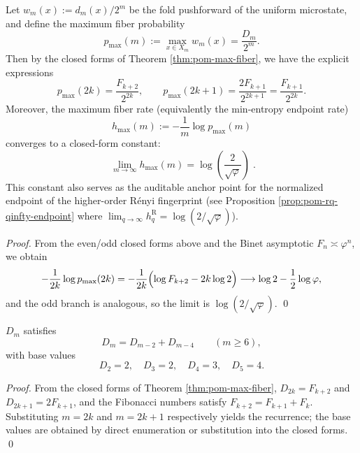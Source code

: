 \begin{corollary}\label{cor:pom-max-fiber-rate-endpoint}
Let \(w_m(x):=d_m(x)/2^m\) be the fold pushforward of the uniform microstate, and define the maximum fiber probability
\[
p_{\max}(m):=\max_{x\in X_m}w_m(x)=\frac{D_m}{2^m}.
\]
Then by the closed forms of Theorem \ref{thm:pom-max-fiber}, we have the explicit expressions
\[
p_{\max}(2k)=\frac{F_{k+2}}{2^{2k}},
\qquad
p_{\max}(2k+1)=\frac{2F_{k+1}}{2^{2k+1}}=\frac{F_{k+1}}{2^{2k}}.
\]
Moreover, the maximum fiber rate (equivalently the min-entropy endpoint rate)
\[
h_{\max}(m):=-\frac{1}{m}\log p_{\max}(m)
\]
converges to a closed-form constant:
\[
\boxed{\;
\lim_{m\to\infty}h_{\max}(m)=\log\!\left(\frac{2}{\sqrt{\varphi}}\right)\; }.
\]
This constant also serves as the auditable anchor point for the normalized endpoint of the higher-order R\'enyi fingerprint (see Proposition \ref{prop:pom-rq-qinfty-endpoint} where \(\lim_{q\to\infty}h_q^{\mathrm R}=\log(2/\sqrt{\varphi})\)).
\end{corollary}
\begin{proof}
From the even/odd closed forms above and the Binet asymptotic \(F_n\asymp \varphi^n\), we obtain
\[
-\frac{1}{2k}\log p_{\max}(2k)
=-\frac{1}{2k}\Bigl(\log F_{k+2}-2k\log 2\Bigr)
\longrightarrow \log 2-\frac12\log\varphi,
\]
and the odd branch is analogous, so the limit is \(\log(2/\sqrt{\varphi})\). \qed
\end{proof}

\begin{corollary}\label{cor:pom-D-rec}
$D_m$ satisfies
\[
D_m=D_{m-2}+D_{m-4}\qquad(m\ge 6),
\]
with base values
\[
D_2=2,\quad D_3=2,\quad D_4=3,\quad D_5=4.
\]
\end{corollary}
\begin{proof}
From the closed forms of Theorem \ref{thm:pom-max-fiber}, $D_{2k}=F_{k+2}$ and $D_{2k+1}=2F_{k+1}$, and the Fibonacci numbers satisfy $F_{k+2}=F_{k+1}+F_k$. Substituting $m=2k$ and $m=2k+1$ respectively yields the recurrence; the base values are obtained by direct enumeration or substitution into the closed forms. \qed
\end{proof}

